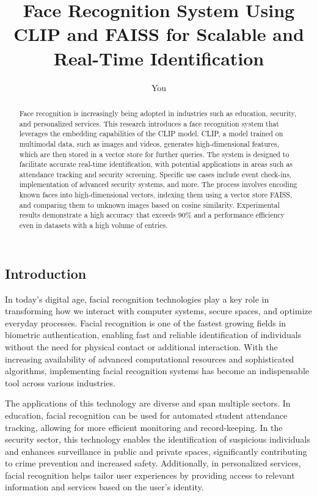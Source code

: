 \documentclass{article}
\title{Face Recognition System Using CLIP and FAISS for Scalable and Real-Time Identification}
\author{You}
\begin{document}
\maketitle

\begin{abstract}
Face recognition is increasingly being adopted in industries such as education, security, and personalized services. This research introduces a face recognition system that leverages the embedding capabilities of the CLIP model. CLIP, a model trained on multimodal data, such as images and videos, generates high-dimensional features, which are then stored in a vector store for further queries. The system is designed to facilitate accurate real-time identification, with potential applications in areas such as attendance tracking and security screening. Specific use cases include event check-ins, implementation of advanced security systems, and more.
The process involves encoding known faces into high-dimensional vectors, indexing them using a vector store FAISS, and comparing them to unknown images based on cosine similarity. Experimental results demonstrate a high accuracy that exceeds 90\% and a performance efficiency even in datasets with a high volume of entries.
\end{abstract}

\subsection*{Introduction}
\hspace*{1.00cm}In today's digital age, facial recognition technologies play a key role in transforming how we interact with computer systems, secure spaces, and optimize everyday processes. Facial recognition is one of the fastest growing fields in biometric authentication, enabling fast and reliable identification of individuals without the need for physical contact or additional interaction\cite{article}. With the increasing availability of advanced computational resources and sophisticated algorithms, implementing facial recognition systems has become an indispensable tool across various industries.

\hspace*{1.00cm}The applications of this technology are diverse and span multiple sectors. In education, facial recognition can be used for automated student attendance tracking, allowing for more efficient monitoring and record-keeping. In the security sector, this technology enables the identification of suspicious individuals and enhances surveillance in public and private spaces, significantly contributing to crime prevention and increased safety. Additionally, in personalized services, facial recognition helps tailor user experiences by providing access to relevant information and services based on the user's identity\cite{parmar2014facerecognitionmethods}.
\end{document}
